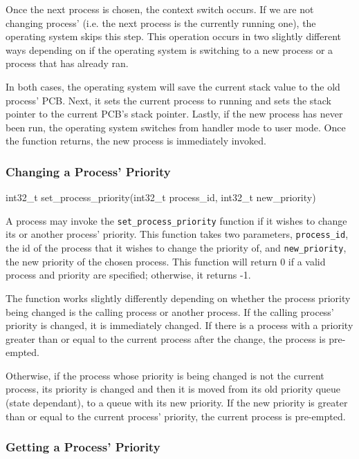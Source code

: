 \documentclass[se]{uw-wkrpt}
\begin{document}
Once the next process is chosen, the context switch occurs. If we are not changing process' (i.e. the next process is the currently running one), the operating system skips this step. This operation occurs in two slightly different ways depending on if the operating system is switching to a new process or a process that has already ran.

In both cases, the operating system will save the current stack value to the old process' PCB. Next, it sets the current process to running and sets the stack pointer to the current PCB's stack pointer. Lastly, if the new process has never been run, the operating system switches from handler mode to user mode. Once the function returns, the new process is immediately invoked.

\subsubsection{Changing a Process' Priority}

\begin{code}
int32_t set_process_priority(int32_t process_id, int32_t new_priority)
\end{code}

A process may invoke the \texttt{set\_process\_priority} function if it wishes to change its or another process' priority. This function takes two parameters, \texttt{process\_id}, the id of the process that it wishes to change the priority of, and \texttt{new\_priority}, the new priority of the chosen process. This function will return 0 if a valid process and priority are specified; otherwise, it returns -1.

The function works slightly differently depending on whether the process priority being changed is the calling process or another process. If the calling process' priority is changed, it is immediately changed. If there is a process with a priority greater than or equal to the current process after the change, the process is pre-empted. 

Otherwise, if the process whose priority is being changed is not the current process, its priority is changed and then it is moved from its old priority queue (state dependant), to a queue with its new priority. If the new priority is greater than or equal to the current process' priority, the current process is pre-empted.

\subsubsection{Getting a Process' Priority}
\end{document}
